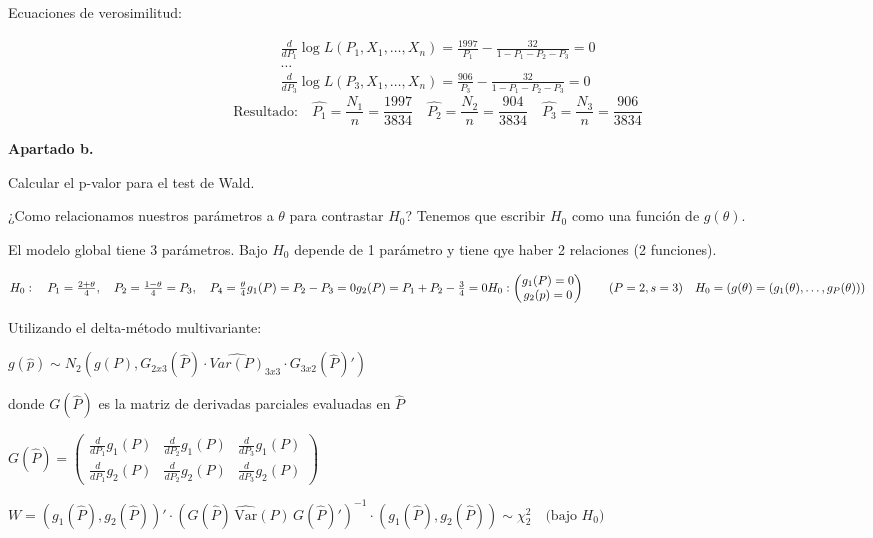 Ecuaciones de verosimilitud:

\[
\begin{matrix}
    \frac{d}{d P_1} \log L(P_1, X_1, \dots, X_n) = \frac{1997}{P_1} - \frac{32}{1 - P_1 - P_2 - P_3} = 0 \\[1em]
    \dots \\[1em]
    \frac{d}{d P_3} \log L(P_3, X_1, \dots, X_n) = \frac{906}{P_3} - \frac{32}{1 - P_1 - P_2 - P_3} = 0
\end{matrix}
\]
\[
    \text{Resultado:}\quad \hat{P_1}=\frac{N_1}{n}=\frac{1997}{3834} \quad \hat{P_2}=\frac{N_2}{n}=\frac{904}{3834} \quad \hat{P_3}=\frac{N_3}{n}=\frac{906}{3834}
\]

\textbf{Apartado b.}

Calcular el p-valor para el test de Wald.

¿Como relacionamos nuestros parámetros a $\theta$ para contrastar $H_0$? Tenemos que escribir $H_0$ como una función de $g(\theta)$.

El modelo global tiene 3 parámetros. Bajo $H_0$ depende de 1 parámetro y tiene qye haber 2 relaciones (2 funciones).

\(
H_0: \quad P_1=\frac{2+\theta}{4}, \quad P_2=\frac{1-\theta}{4}=P_3, \quad P_4=\frac{\theta}{4}
\\g_1(P)=P_2-P_3=0
\\g_2(P)=P_1+P_2-\frac{3}{4}=0
\\H_0:
\begin{pmatrix}
    g_1(P)=0 \\
    g_2(p)=0
\end{pmatrix} \qquad (P=2,s=3) \quad H_0=(g(\theta)=(g_1(\theta),\dots,g_P(\theta)))
\)

Utilizando el delta-método multivariante:

\(
g(\hat{p})\sim N_2(g(P),G_{2x3}(\hat{P})\cdot \hat{Var(P)}_{3x3} \cdot G_{3x2}(\hat{P})')
\)

donde $G(\hat{P})$ es la matriz de derivadas parciales evaluadas en $\hat{P}$

\(
G(\hat{P})=
\begin{pmatrix}
    \frac{d}{d P_1} g_1(P) & \frac{d}{d P_2} g_1(P) & \frac{d}{d P_3} g_1(P) \\
    \frac{d}{d P_1} g_2(P) & \frac{d}{d P_2} g_2(P) & \frac{d}{d P_3} g_2(P) 
\end{pmatrix}
\)

\(
W = \left( g_1(\hat{P}), g_2(\hat{P}) \right)' \cdot \left( G(\hat{P}) \, \hat{\text{Var}}(P) \, G(\hat{P})' \right)^{-1} \cdot \left( g_1(\hat{P}), g_2(\hat{P}) \right) \sim \chi^2_2 \quad \text{(bajo } H_0\text{)}
\)

